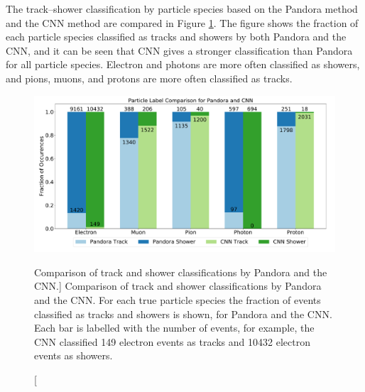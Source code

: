 The track--shower classification by particle species based on the Pandora 
method and the CNN method are compared in Figure \ref{fig:track_show_pan_cnn}. 
The figure shows the fraction of each particle species classified as tracks and
showers by both Pandora and the CNN, and it can be seen that CNN gives a 
stronger classification than Pandora for all particle species. Electron and 
photons are more often classified as showers, and pions, muons, and protons 
are more often classified as tracks. 
\begin{figure}
	\centering
	\includegraphics[width=\textwidth]{figures/track_shower_labels.pdf}
	\caption
	[Comparison of track and shower classifications by Pandora and the CNN.]
	{Comparison of track and shower classifications by Pandora and the CNN. For
	each true particle species the fraction of events classified as tracks and
	showers is shown, for Pandora and the CNN. Each bar is labelled with the 
	number of events, for example, the CNN classified 149 electron events as 
	tracks and 10432 electron events as showers.}
	\label{fig:track_show_pan_cnn}
\end{figure}

